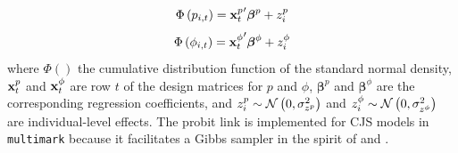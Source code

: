 \documentclass[12pt]{article}
\begin{document}
\begin{equation*}
  \Phi \left( p_{i,t} \right) = {{\bf x}^p_t}^\prime \boldsymbol{\beta}^p + z^p_i
\end{equation*}
\begin{equation*}
  \Phi \left( \phi_{i,t} \right) = {{\bf x}^\phi_t}^\prime \boldsymbol{\beta}^\phi + z^\phi_i
\end{equation*}
where $\Phi()$ the cumulative distribution function of the standard normal density, ${\bf x}^p_t$ and ${\bf x}^\phi_t$ are row $t$ of the design matrices for $p$ and $\phi$, $\boldsymbol{\beta}^p$ and $\boldsymbol{\beta}^\phi$ are the corresponding regression coefficients, and $z^p_i \sim {\cal N} \left( 0,\sigma^2_{z^p} \right)$ and $z^\phi_i \sim {\cal N} \left( 0,\sigma^2_{z^\phi} \right)$ are individual-level effects. The probit link is implemented for CJS models in \verb|multimark| because it facilitates a Gibbs sampler in the spirit of \cite{Albert&Chib1993} and \cite{LaakeEtAl2013}.
\end{document}
